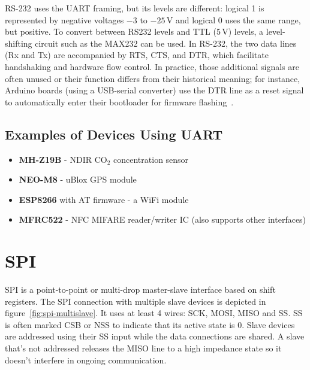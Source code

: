 RS-232 uses the \gls{UART} framing, but its levels are different: logical 1 is represented by negative voltages $-3$ to $-25$\,V and logical 0 uses the same range, but positive. To convert between RS232 levels and \gls{TTL} (5\,V) levels, a level-shifting circuit such as the MAX232 can be used. In RS-232, the two data lines (Rx and Tx) are accompanied by \gls{RTS}, \gls{CTS}, and \gls{DTR}, which facilitate handshaking and hardware flow control. In practice, those additional signals are often unused or their function differs from their historical meaning; for instance, Arduino boards (using a USB-serial converter) use the \gls{DTR} line as a reset signal to automatically enter their bootloader for firmware flashing~\cite{arduinodtr}.

\subsection{Examples of Devices Using UART}

\begin{itemize}
	\item \textbf{MH-Z19B} - \gls{NDIR} CO$_2$ concentration sensor
	\item \textbf{NEO-M8} - uBlox \gls{GPS} module
	\item \textbf{ESP8266} with AT firmware - a WiFi module
	\item \textbf{MFRC522} - \gls{NFC} MIFARE reader/writer \gls{IC} (also supports other interfaces)
\end{itemize}

\section{SPI} \label{sec:theory-spi}

\acrfull{SPI} is a point-to-point or multi-drop master-slave interface based on shift registers. The \gls{SPI} connection with multiple slave devices is depicted in figure~\ref{fig:spi-multislave}. It uses at least 4 wires: \gls{SCK}, \gls{MOSI}, \gls{MISO} and \gls{SS}. \gls{SS} is often marked \gls{CSB} or \gls{NSS} to indicate that its active state is 0. Slave devices are addressed using their \gls{SS} input while the data connections are shared. A slave that's not addressed releases the \gls{MISO} line to a high impedance state so it doesn't interfere in ongoing communication.

